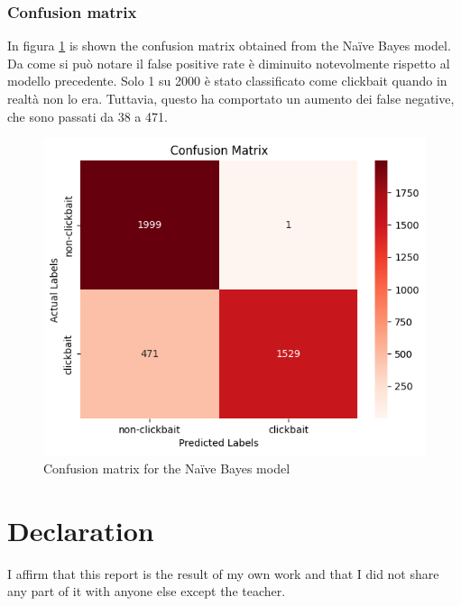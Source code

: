 \documentclass{class}
\begin{document}
\subsubsection*{Confusion matrix}
In figura \ref{fig-14} is shown the confusion matrix obtained from the Na\"ive Bayes model.
Da come si può notare il false positive rate è diminuito notevolmente rispetto al modello precedente.
Solo 1 su 2000 è stato classificato come clickbait quando in realtà non lo era.
Tuttavia, questo ha comportato un aumento dei false negative, che sono passati da 38 a 471.
\begin{figure}[h]
    \centering
    \includegraphics[width=0.5\columnwidth]{images/fpr_naive_conf_matrix.png}
    \caption{Confusion matrix for the Na\"ive Bayes model}
    \label{fig-14}
\end{figure}

\section{Declaration}
I affirm that this report is the result of my own work and that I did not share any part of it with anyone
else except the teacher.
\end{document}
